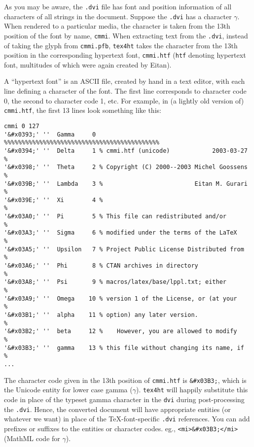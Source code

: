 As you may be aware, the \Verb=.dvi= file has font and position
information of all characters of all strings in the document. Suppose
the \Verb=.dvi= has a character $\gamma$. When rendered to a
particular media, the character is taken from the 13th position of the
font by name, \Verb=cmmi=.  When extracting text from the \Verb=.dvi=,
instead of taking the glyph from \Verb=cmmi.pfb=, \Verb=tex4ht= takes
the character from the 13th position in the corresponding hypertext
font, \Verb=cmmi.htf= (\Verb=htf= denoting hypertext font, multitudes
of which were again created by Eitan).

A ``hypertext font'' is an ASCII file, created by hand in a text
editor, with each line defining a character of the font.  The first
line corresponds to character code 0, the second to character code 1,
etc.  For example, in (a lightly old version of) \Verb=cmmi.htf=, the
first 13 lines look something like this:

\begin{verbatim}
cmmi 0 127
'&#x0393;' ''  Gamma     0 %%%%%%%%%%%%%%%%%%%%%%%%%%%%%%%%%%%%%%%%%%%%
'&#x0394;' ''  Delta     1 % cmmi.htf (unicode)            2003-03-27 %
'&#x0398;' ''  Theta     2 % Copyright (C) 2000--2003 Michel Goossens %
'&#x039B;' ''  Lambda    3 %                          Eitan M. Gurari %
'&#x039E;' ''  Xi        4 %                                          % 
'&#x03A0;' ''  Pi        5 % This file can redistributed and/or       % 
'&#x03A3;' ''  Sigma     6 % modified under the terms of the LaTeX    % 
'&#x03A5;' ''  Upsilon   7 % Project Public License Distributed from  % 
'&#x03A6;' ''  Phi       8 % CTAN archives in directory               % 
'&#x03A8;' ''  Psi       9 % macros/latex/base/lppl.txt; either       % 
'&#x03A9;' ''  Omega    10 % version 1 of the License, or (at your    % 
'&#x03B1;' ''  alpha    11 % option) any later version.               % 
'&#x03B2;' ''  beta     12 %    However, you are allowed to modify    % 
'&#x03B3;' ''  gamma    13 % this file without changing its name, if  % 
...
\end{verbatim}

The character code given in the 13th position of \Verb=cmmi.htf= is
\Verb=&#x03B3;=, which is the Unicode entity for lower case gamma
($\gamma$). \Verb=tex4ht= will happily substitute this code in
place of the typeset gamma character in the \Verb=dvi= during
post-processing the \Verb=.dvi=.  Hence, the converted document will
have appropriate entities (or whatever we want) in place of the
\TeX{}-font-specific \Verb=.dvi= references.  You can add prefixes or
suffixes to the entities or character codes. eg.,
\Verb=<mi>&#x03B3;</mi>= (MathML code for $\gamma$).

